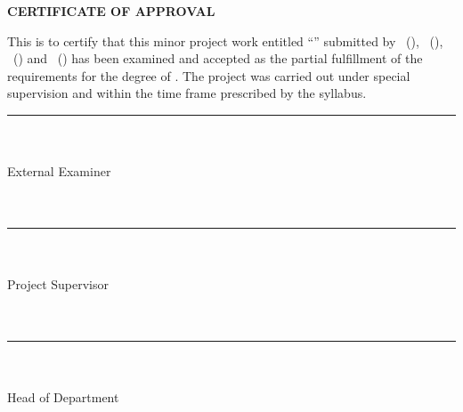 \clearpage
\thispagestyle{empty}
\begin{center}
{\large\bfseries CERTIFICATE OF APPROVAL}
\end{center}

\vspace{0.8cm}

\noindent
This is to certify that this minor project work entitled
``\projecttitle'' submitted by
\memberone\ (\rollone), \membertwo\ (\rolltwo),
\memberthree\ (\rollthree) and \memberfour\ (\rollfour)
has been examined and accepted as the partial fulfillment of the requirements
for the degree of \degreename. The project was carried out under special
supervision and within the time frame prescribed by the syllabus.

\vspace{2.0cm}

\noindent
\begin{minipage}[t]{0.47\textwidth}
\centering
\rule{0.9\textwidth}{0.4pt}\\
\externalname\\
External Examiner\\
\externaldesignation\\
\departmentname\\
\externalcollege
\end{minipage}
\hfill
\begin{minipage}[t]{0.47\textwidth}
\centering
\rule{0.9\textwidth}{0.4pt}\\
\supervisorname\\
Project Supervisor\\
\supervisordesignation\\
\departmentname\\
\collegename
\end{minipage}

\vspace{2.5cm}

\begin{center}
\begin{minipage}{0.6\textwidth}
\centering
\rule{0.9\textwidth}{0.4pt}\\
\hodname\\
Head of Department\\
\departmentname\\
\collegename
\end{minipage}
\end{center}

\clearpage

